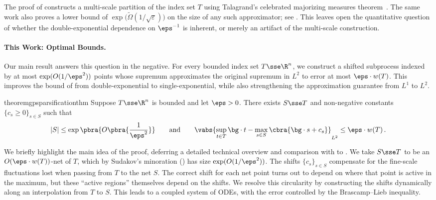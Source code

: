 \documentclass[11pt]{article}
\begin{document}
The proof of \cite{de2026sparsifying} constructs a multi-scale partition of the index set $T$ using Talagrand's celebrated majorizing measures theorem~\cite{talagrand2022upper}. 
The same work also proves a lower bound of $\exp\big(\widetilde{\Omega}(1/\sqrt{\varepsilon})\big)$ on the size of any such approximator; see \cite[Corollary~35]{de2026sparsifying}. 
This leaves open the quantitative question of whether the double-exponential dependence on $\eps^{-1}$ is inherent, or merely an artifact of the multi-scale construction. 

\paragraph{This Work: Optimal Bounds.} 

Our main result answers this question in the negative. 
For every bounded index set $T\sse \R^n$, we construct a shifted subprocess indexed by at most $\exp(O(1/\eps^2))$ points whose supremum approximates the original supremum in $L^2$ to error at most $\eps\cdot w(T)$. 
This improves the bound of \cite{de2026sparsifying} from double-exponential to single-exponential, while also strengthening the approximation guarantee from $L^1$ to $L^2$. 

\begin{restatable}{theorem}{gpsparsificationthm}
\label{thm:GP-sparsification}
	Suppose $T \sse \R^n$ is bounded and let $\eps > 0$. 
	There exists $S \sse T$ and non-negative constants $\{c_s \geq 0\}_{s\in S}$ such that 
	\[
		|S| \leq \exp\pbra{O\pbra{\frac{1}{\eps^2}}}
		\qquad\text{and}\qquad 
		\vabs{
			\sup_{t\in T}\bg\cdot t - \max_{s \in S} \cbra{\bg\cdot s + c_s} 
		}_{L^2} 
		\leq 
		\eps\cdot w(T)\,. 
	\]
\end{restatable} 

We briefly highlight the main idea of the proof, deferring a detailed technical overview and comparison with \cite{de2026sparsifying} to .   
We take $S\sse T$ to be an $O(\eps\cdot w(T))$-net of $T$, which by Sudakov's minoration () has size $\exp(O(1/\eps^2))$.  
The shifts $\{c_s\}_{s\in S}$ compensate for the fine-scale fluctuations lost when passing from $T$ to the net $S$.  
The correct shift for each net point turns out to depend on where that point is active in the maximum, but these ``active regions'' themselves depend on the shifts.  
We resolve this circularity by constructing the shifts dynamically along an interpolation from $T$ to $S$.  
This leads to a coupled system of ODEs, with the error controlled by the Brascamp--Lieb inequality. 
\end{document}
